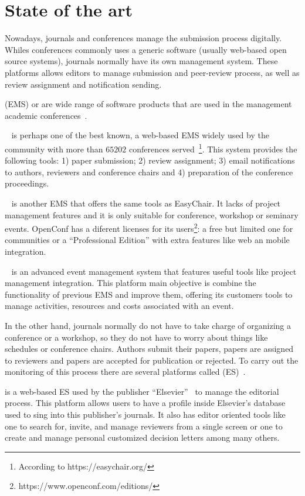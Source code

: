 \section{State of the art}
\label{sec:state-art}

Nowadays, journals and conferences manage the submission process digitally.
Whiles conferences commonly uses a generic software (usually web-based open
source systems), journals normally have its own management system. These
platforms allows editors to manage submission and peer-review process, as well
as review assignment and notification sending.

 (EMS) or  are
wide range of software products that are used in the management academic
conferences~\cite{azar2006academic}.

~\cite{easychair} is perhaps one of the best known, a web-based
EMS widely used by the community with more than $65202$ conferences
served~\footnote{According to https://easychair.org/}. This system provides the
following tools: 1) paper submission; 2) review assignment; 3) email
notifications to authors, reviewers and conference chairs and 4) preparation of
the conference proceedings.

~\cite{openconf} is another EMS that offers the same tools as
EasyChair. It lacks of project management features and it is only suitable for
conference, workshop or seminary events. OpenConf has a diferent licenses for
its users\footnote{https://www.openconf.com/editions/}: a free but limited one
for communities or a ``Professional Edition'' with extra features like web an
mobile integration.

~\cite{paulo2011aems} is an advanced event management system that
features useful tools like project management integration. This platform main
objective is combine the functionality of previous EMS and improve them,
offering its customers tools to manage activities, resources and costs
associated with an event.

In the other hand, journals normally do not have to take charge of organizing a
conference or a workshop, so they do not have to worry about things like
schedules or conference chairs. Authors submit their papers, papers are assigned
to reviewers and papers are accepted for publication or rejected. To carry out
the monitoring of this process there are several platforms called  (ES)~\cite{Lev2016}.

 is a web-based ES used by the publisher ``Elsevier''~\cite{evise} to
manage the editorial process. This platform allows users to have a profile
inside Elsevier's database used to sing into this publisher's journals. It also
has editor oriented tools like one to search for, invite, and manage reviewers
from a single screen or one to create and manage personal customized decision
letters among many others.

